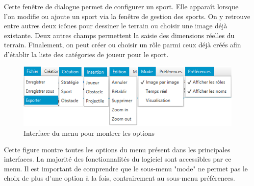Cette fenêtre de dialogue permet de configurer un sport.
Elle apparaît lorsque l'on modifie ou ajoute un sport via la fenêtre de gestion des sports.
On y retrouve entre autres deux icônes pour dessiner le terrain ou choisir une image déjà existante.
Deux autres champs permettent la saisie des dimensions réelles du terrain.
Finalement, on peut créer ou choisir un rôle parmi ceux déjà créés afin d'établir la liste des catégories de joueur pour le sport.

\begin{figure}[htpb]
    \centering
    \includegraphics[scale=0.7]{fig/gui/gui_menu.png}
    \caption{Interface du menu pour montrer les options}
    \label{fig:gui:gui_menu}
\end{figure}

Cette figure montre toutes les options du menu présent dans les principales interfaces.
La majorité des fonctionnalités du logiciel sont accessibles par ce menu.
Il est important de comprendre que le sous-menu "mode" ne permet pas le choix de plus d'une option à la fois, contrairement au sous-menu préférences.
